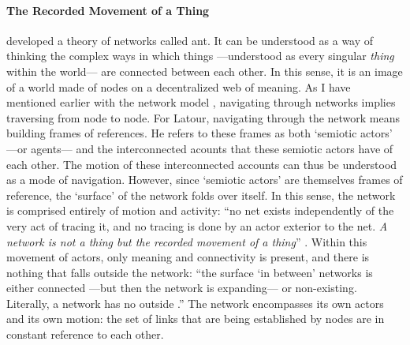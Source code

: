 
\paragraph{The Recorded Movement of a Thing}
\textcite{Lat90:On, Lat93:We} developed a theory of networks called \gls{ant}. It can be understood as a way of thinking the complex ways in which things ---understood as every singular \textit{thing} within the world--- are connected between each other. In this sense, it is an image of a world made of nodes on a decentralized web of meaning. As I have mentioned earlier with the network model , navigating through networks implies traversing from node to node. For Latour, navigating through the network means building frames of references. He refers to these frames as both `semiotic actors' ---or agents--- and the interconnected acounts that these semiotic actors have of each other. The motion of these interconnected accounts can thus be understood as a mode of navigation. However, since `semiotic actors' are themselves frames of reference, the `surface' of the network folds over itself. In this sense, the network is comprised entirely of motion and activity: ``no net exists independently of the very act of tracing it, and no tracing is done by an actor exterior to the net. \textit{A network is not a thing but the recorded movement of a thing}'' \im \parencite[14]{Lat90:On}. Within this movement of actors, only meaning and connectivity is present, and there is nothing that falls outside the network: ``the surface `in between' networks is either connected ---but then the network is expanding--- or non-existing. Literally, a network has no outside \parencite[6]{Lat90:On}.'' The network encompasses its own actors and its own motion: the set of links that are being established by nodes are in constant reference to each other.




